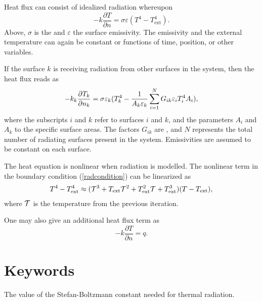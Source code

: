 \begin{versiona}
Heat flux can consist of idealized radiation whereupon
\begin{equation}
-k\frac{\partial T}{\partial n} =\sigma\varepsilon (T^4 -T^4_\mathrm{ext} ).
\label{radcondition}
\end{equation}
Above,  $\sigma$ is the  and $\varepsilon$ the 
surface emissivity. The emissivity and the external temperature can 
again be constant or functions of time, position, or other variables.

If the surface $k$ is receiving radiation from other surfaces in the system,
then the heat flux reads as
\begin{equation}
-k_k \frac{\partial T_k}{\partial n_k} = \sigma \varepsilon_k (T_k^4 -
{1\over {A_k \varepsilon_k}} \sum_{i=1}^N G_{ik} \varepsilon_i  T_i^4 A_i ),
\end{equation}
where the subscripts $i$ and $k$ refer to surfaces $i$ and $k$, and the parameters $A_i$ and
$A_k$ to the specific surface areas. The factors $G_{ik}$ are , and
$N$ represents the total number of radiating surfaces present in the system.
Emissivities are assumed to be constant on each surface.

The heat equation is nonlinear when radiation is modelled.
The nonlinear term in the boundary condition (\ref{radcondition})
can be linearized as
\begin{eqnarray}
T^4 - T^4_\mathrm{ext} \approx
( {\cal T}^3 + T_\mathrm{ext} {\cal T}^2  + T^2_\mathrm{ext} {\cal T} + 
T^3_\mathrm{ext} )( T-T_\mathrm{ext} ),
\end{eqnarray}
where $\cal{T}$ is the temperature from the previous iteration.

One may also give an additional heat flux term as
\begin{equation}
-k\frac{\partial T}{\partial n} = q.
\end{equation}


\section{Keywords} 
\end{versiona}


\sifbegin
{}
\sifbegin
{}
The value of the Stefan-Boltzmann constant needed for 
thermal radiation.
\sifend

